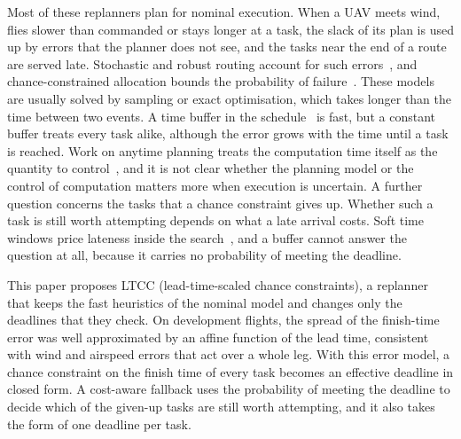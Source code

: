 \documentclass[a4paper,fleqn]{cas-dc}
\newcommand{\mname}{LTCC}  %
\newcounter{prop}
\begin{document}
Most of these replanners plan for nominal execution. When a UAV meets wind, flies slower than commanded or stays longer
at a task, the slack of its plan is used up by errors that the planner does not see, and the tasks near the end of a
route are served late. Stochastic and robust routing account for such
errors~\cite{agra2013robust,ehmke2015ensuring,rostami2021correlated,cheng2024weather}, and chance-constrained
allocation bounds the probability of failure~\cite{ponda2012chance,gao2025drcc}. These models are usually solved by
sampling or exact optimisation, which takes longer than the time between two events. A time buffer in the
schedule~\cite{jabali2015selfimposed} is fast, but a constant buffer treats every task alike, although the error grows
with the time until a task is reached. Work on anytime
planning treats the computation time itself as the quantity to
control~\cite{zilberstein1996using,svegliato2018meta,herrmann2023metareasoning}, and it is not clear whether the
planning model or the control of computation matters more when execution is uncertain. A further question concerns the
tasks that a chance constraint gives up. Whether such a task is still worth attempting depends on what a late arrival
costs. Soft time windows price lateness inside the search~\cite{tas2013stochastic}, and a buffer cannot answer the
question at all, because it carries no probability of meeting the deadline.

This paper proposes \mname{} (lead-time-scaled chance constraints), a replanner that keeps the fast heuristics of the
nominal model and changes only the deadlines that they check. On development flights, the spread of the finish-time
error was well approximated by an affine function of the lead time, consistent with wind and airspeed errors that act
over a whole leg. With this error model, a chance constraint on the finish time of every task becomes an effective deadline in closed form. A cost-aware fallback
uses the probability of meeting the deadline to decide which of the given-up tasks are still worth attempting, and it
also takes the form of one deadline per task.
\end{document}
